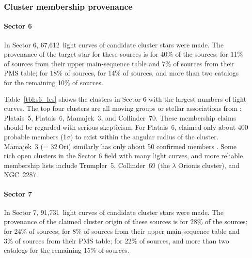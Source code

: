 \documentclass[12pt,twocolumn,tighten]{aastex62}
\newcommand{\sVInumberlcs}{67{,}612\ }  %
\newcommand{\sVIInumberlcs}{91{,}731\ }  %
\begin{document}
\subsubsection{Cluster membership provenance}

\paragraph{Sector 6}
In Sector 6, \sVInumberlcs light curves of candidate cluster stars
were made. The provenance of the target star for these
sources is \citet{dias_proper_2014} for 40\% of the sources;
\citet{zari_3d_2018} for 11\% of sources from their upper
main-sequence table and 7\% of sources from their PMS table;
\citet{Kharchenko_et_al_2013} for 18\% of sources,
\citet{cantat-gaudin_gaia_2018} for 14\% of sources, and more than two
catalogs for the remaining 10\% of sources.

Table~\ref{tbl:s6_lcs} shows the clusters in Sector 6 with the largest
numbers of light curves. The top four clusters are all moving groups
or stellar associations from \citet{dias_proper_2014}: Platais~5,
Platais~6, Mamajek~3, and Collinder~70.  These membership claims
should be regarded with serious skepticism.  For Platais~6,
\citet{Kharchenko_et_al_2013} claimed only about 400 probable members
(1$\sigma$) to exist within the angular radius of the cluster.
Mamajek~3 (= 32$\,$Ori) similarly has only about 50 confirmed members
\citep{bell_32ori_2017}.
Some rich open clusters in the Sector 6 field with many light curves,
and more reliable membership lists include Trumpler~5,
Collinder~69 (the $\lambda$ Orionis cluster), and NGC~2287.


\paragraph{Sector 7}
In Sector 7, \sVIInumberlcs light curves of candidate cluster stars
were made.  The provenance of the claimed cluster origin of these
sources is \citet{dias_proper_2014} for 28\% of the sources;
\citet{Kharchenko_et_al_2013} for 24\% of sources;
\citet{zari_3d_2018} for 8\% of sources from their upper main-sequence
table and 3\% of sources from their PMS table;
\citet{cantat-gaudin_gaia_2018} for 22\% of sources, and more than two
catalogs for the remaining 15\% of sources.
\end{document}

